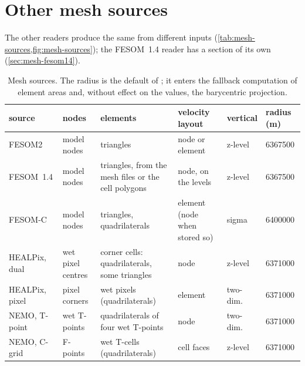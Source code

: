 

\section{Other mesh sources}\label{sec:mesh-sources}

The other readers produce the same  from different inputs (\cref{tab:mesh-sources,fig:mesh-sources});
the FESOM~1.4 reader has a section of its own (\cref{sec:mesh-fesom14}).

\begin{table}[t]
\centering\footnotesize\setlength{\tabcolsep}{4pt}
\begin{tabular}{@{}>{\raggedright\arraybackslash}p{23mm}>{\raggedright\arraybackslash}p{29mm}>{\raggedright\arraybackslash}p{29mm}>{\raggedright\arraybackslash}p{17mm}>{\raggedright\arraybackslash}p{16mm}>{\raggedright\arraybackslash}p{14mm}@{}}
\toprule
source & nodes & elements & velocity layout & vertical & radius (m) \\
\midrule
FESOM2 & model nodes & triangles & node or element & z-level & \num{6367500} \\
FESOM~1.4 & model nodes & triangles, from the mesh files or the cell polygons & node, on the levels & z-level & \num{6367500} \\
FESOM-C & model nodes & triangles, quadrilaterals & element (node when stored so) & sigma & \num{6400000} \\
HEALPix, dual & wet pixel centres & corner cells: quadrilaterals, some triangles & node & z-level & \num{6371000} \\
HEALPix, pixel & pixel corners & wet pixels (quadrilaterals) & element & two-dim. & \num{6371000} \\
NEMO, T-point & wet T-points & quadrilaterals of four wet T-points & node & two-dim. & \num{6371000} \\
NEMO, C-grid & F-points & wet T-cells (quadrilaterals) & cell faces & z-level & \num{6371000} \\
\bottomrule
\end{tabular}
\caption{Mesh sources. The radius is the default of ; it enters the fallback
computation of element areas and, without effect on the values, the barycentric projection.}
\label{tab:mesh-sources}
\end{table}

